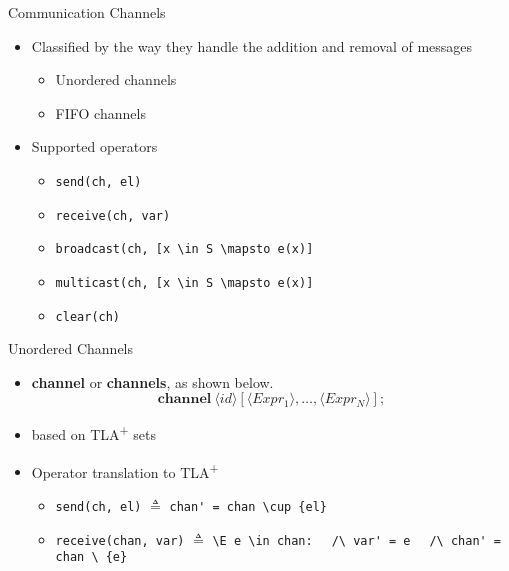 \documentclass{beamer}
\newcommand\tab[1][1cm]{\hspace*{#1}}
\newcommand{\tlaplus}{TLA\textsuperscript{+}\xspace}
\newcommand{\keyword}[1]{\textbf{#1}}
\newcommand{\entity}[1]{\ensuremath{\langle}#1\ensuremath{\rangle}}
\begin{document}
\begin{frame}[fragile]{Communication Channels}
    \begin{itemize}
        \item Classified by the way they handle the addition and removal of messages 
            \begin{itemize}
                \item Unordered channels 
                \item FIFO channels 
            \end{itemize}
     \item Supported operators 
            \begin{itemize}
                \item \verb|send(ch, el)|
                \item \verb|receive(ch, var)|
                \item \verb|broadcast(ch, [x \in S \mapsto e(x)]| 
                \item \verb|multicast(ch, [x \in S \mapsto e(x)]|
                \item \verb|clear(ch)|
            \end{itemize}

    \end{itemize}
\end{frame}

\begin{frame}[fragile]{Unordered Channels}
    \begin{itemize}
        \item \keyword{channel} or \keyword{channels}, as shown below.
        \[
            \keyword{channel}\ \entity{id}[\entity{Expr_1},\dots,\entity{Expr_N}];
        \]
         \item based on \tlaplus sets
     \item Operator translation to \tlaplus
            \begin{itemize}
                \item \verb|send(ch, el)| $\triangleq$
                \verb|chan' = chan \cup {el}| 
                \newline
                \item \verb|receive(chan, var)| $\triangleq$
                      \verb|\E e \in chan:| \newline \tab\tab\tab\tab
                         \verb|  /\ var' = e|\newline \tab\tab\tab\tab
                         \verb|  /\ chan' =  chan \ {e}|
            \end{itemize}

    \end{itemize}
\end{frame}
\end{document}
